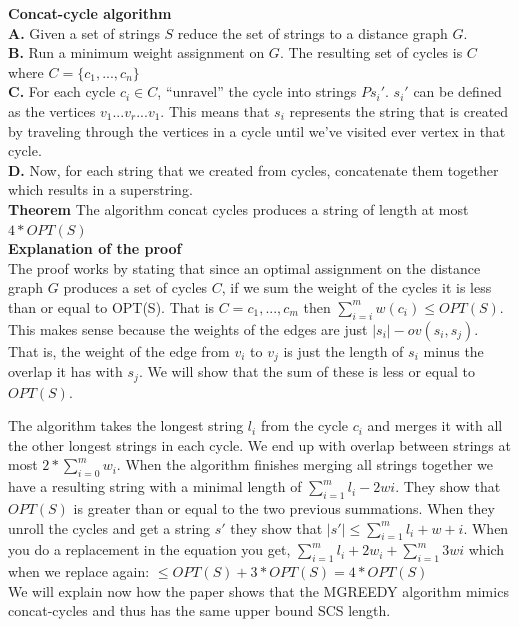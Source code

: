 \documentclass[letterpaper,11pt,titlepage]{article}
\begin{document}
\textbf{Concat-cycle algorithm}\\

\textbf{A.} Given a set of strings $S$ reduce the set of strings to a distance graph $G$. \\
\textbf{B.} Run a minimum weight assignment on $G$. The resulting set of cycles is $C$ where $C = \{c_1, ..., c_n\}$\\
\textbf{C.} For each cycle $c_i \in C$,  ``unravel'' the cycle into strings $Ps_i'$. $s_i'$ can be defined as the vertices $v_1 ... v_r ... v_1$. This means that $s_i$ represents the  string that is created by traveling through the vertices in a cycle until we've visited ever vertex in that cycle.\\
\textbf{D.} Now, for each string that we created from cycles, concatenate them together which results in a superstring.\\

\textbf{Theorem}
The algorithm concat cycles produces a string of length at most $4 * OPT(S)$\\

\textbf{Explanation of the proof}\\

The proof works by stating that since an optimal assignment on the distance graph $G$ produces a set of cycles $C$, if we sum the weight of the cycles it is less than or equal to OPT(S). That is $C = {c_1, ..., c_m}$ then $\sum_{i=i}^m w(c_i) \leq OPT(S)$. This makes sense because the weights of the edges are just $|s_i| - ov(s_i,s_j)$. That is, the weight of the edge from $v_i$ to $v_j$ is just the length of $s_i$ minus the overlap it has with $s_j$. We will show that the sum of these is less or equal to $OPT(S)$.

The algorithm takes the longest string $l_i$ from the cycle $c_i$ and merges it with all the other longest strings in each cycle. We end up with overlap between strings at most $2*\sum_{i=0}^m w_i$. When the algorithm finishes merging all strings together we have a resulting string with a minimal length of $\sum_{i=1}^m l_i - 2wi$.  They show that $OPT(S)$ is greater than or equal to the two previous summations. When they unroll the cycles and get a string $s'$ they show that $|s'| \leq \sum_{i=1}^m l_i + w+i$. When you do a replacement in the equation you get, $\sum_{i=1}^m l_i + 2w_i + \sum_{i=1}^m 3wi$ which when we replace again: $\leq OPT(S) + 3 * OPT(S) = 4 * OPT(S)$\\

We will explain now how the paper shows that the MGREEDY algorithm mimics concat-cycles and thus has the same upper bound SCS length.
\end{document}
